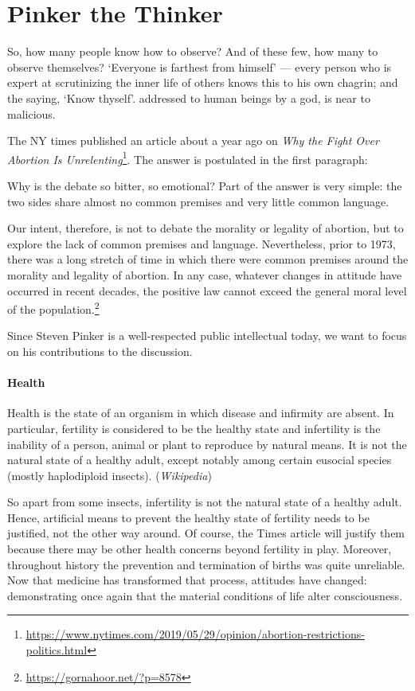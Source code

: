 \section{Pinker the Thinker}

\begin{quotex}
So, how many people know how to observe? And of these few, how many to observe themselves? `Everyone is farthest from himself’ — every person who is expert at scrutinizing the inner life of others knows this to his own chagrin; and the saying, `Know thyself'. addressed to human beings by a god, is near to malicious. 

\end{quotex}
The NY times published an article about a year ago on \textit{Why the Fight Over Abortion Is Unrelenting}\footnote{\url{https://www.nytimes.com/2019/05/29/opinion/abortion-restrictions-politics.html}}. The answer is postulated in the first paragraph:

\begin{quotex}
Why is the debate so bitter, so emotional? Part of the answer is very simple: the two sides share almost no common premises and very little common language. 

\end{quotex}
Our intent, therefore, is not to debate the morality or legality of abortion, but to explore the lack of common premises and language. Nevertheless, prior to 1973, there was a long stretch of time in which there were common premises around the morality and legality of abortion. In any case, whatever changes in attitude have occurred in recent decades, the positive law cannot exceed the general moral level of the population.\footnote{\url{https://gornahoor.net/?p=8578}}

Since Steven Pinker is a well-respected public intellectual today, we want to focus on his contributions to the discussion.

\paragraph{Health}
\begin{quotex}
Health is the state of an organism in which disease and infirmity are absent. In particular, fertility is considered to be the healthy state and infertility is the inability of a person, animal or plant to reproduce by natural means. It is not the natural state of a healthy adult, except notably among certain eusocial species (mostly haplodiploid insects). (\emph{Wikipedia}) 

\end{quotex}
So apart from some insects, infertility is not the natural state of a healthy adult. Hence, artificial means to prevent the healthy state of fertility needs to be justified, not the other way around. Of course, the Times article will justify them because there may be other health concerns beyond fertility in play. Moreover, throughout history the prevention and termination of births was quite unreliable. Now that medicine has transformed that process, attitudes have changed: demonstrating once again that the material conditions of life alter consciousness.

